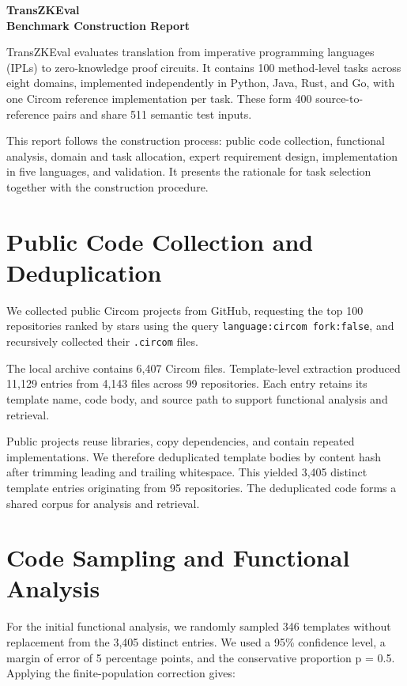 \documentclass[11pt,a4paper]{article}
\begin{document}
\begin{center}
{\LARGE\bfseries\color{ink} TransZKEval\\[4pt] Benchmark Construction Report}
\end{center}
\vspace{.6em}

TransZKEval evaluates translation from imperative programming languages (IPLs) to zero-knowledge proof circuits. It contains 100 method-level tasks across eight domains, implemented independently in Python, Java, Rust, and Go, with one Circom reference implementation per task. These form 400 source-to-reference pairs and share 511 semantic test inputs.

This report follows the construction process: public code collection, functional analysis, domain and task allocation, expert requirement design, implementation in five languages, and validation. It presents the rationale for task selection together with the construction procedure.

\section{Public Code Collection and Deduplication}

We collected public Circom projects from GitHub, requesting the top 100 repositories ranked by stars using the query \texttt{language:circom fork:false}, and recursively collected their \texttt{.circom} files.

The local archive contains 6,407 Circom files. Template-level extraction produced 11,129 entries from 4,143 files across 99 repositories. Each entry retains its template name, code body, and source path to support functional analysis and retrieval.

Public projects reuse libraries, copy dependencies, and contain repeated implementations. We therefore deduplicated template bodies by content hash after trimming leading and trailing whitespace. This yielded 3,405 distinct template entries originating from 95 repositories. The deduplicated code forms a shared corpus for analysis and retrieval.

\section{Code Sampling and Functional Analysis}

For the initial functional analysis, we randomly sampled 346 templates without replacement from the 3,405 distinct entries. We used a 95\% confidence level, a margin of error of 5 percentage points, and the conservative proportion p = 0.5. Applying the finite-population correction gives:
\end{document}
